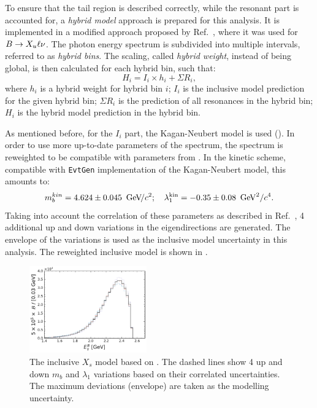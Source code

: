 To ensure that the tail region is described correctly, while the resonant part is accounted for, a \textit{hybrid model} approach is prepared for this analysis.
It is implemented in a modified approach proposed by Ref.~\cite{Ramirez:1989yk}, where it was used for $B\rightarrow X_u\ell\nu$.
The \BtoXsgamma photon energy spectrum is subdivided into multiple intervals, referred to as \textit{hybrid bins}.
The scaling, called \textit{hybrid weight}, instead of being global, is then calculated for each hybrid bin, such that:
\begin{equation}\label{eq:hybrid_model_definition}
    H_i = I_i\times h_i + \Sigma R_i,
\end{equation}
where $h_i$ is a hybrid weight for hybrid bin $i$; 
$I_i$ is the inclusive model prediction for the given hybrid bin; 
$\Sigma R_i$ is the prediction of all resonances in the hybrid bin;
$H_i$ is the hybrid model prediction in the hybrid bin.

As mentioned before, for the $I_i$ part, the Kagan-Neubert model is used ().
In order to use more up-to-date parameters of the spectrum, the spectrum is reweighted to be compatible with parameters from .
In the kinetic scheme, compatible with \texttt{EvtGen} implementation of the Kagan-Neubert model, this amounts to:
\begin{equation}\label{eq:simba_result_kinetic}
    m_b^{kin} =4.624 \pm 0.045~{\mathrm{\,Ge\kern -0.1em V\!/}c^2};  \quad \lambda^{\mathrm{kin}}_1 = -0.35\pm0.08~\mathrm{\,Ge\kern -0.1em V}^2/c^4.
\end{equation}
Taking into account the correlation of these parameters as described in Ref.~\cite{Bernlochner:2020jlt}, 4 additional up and down variations in the eigendirections are generated. 
The envelope of the variations is used as the inclusive model uncertainty in this analysis.
The reweighted inclusive model is shown in .
\begin{figure}[htbp!]
    \centering
    \includegraphics[width=0.45\textwidth]{figures/data_samples/xs_model_inclusive.pdf}
    \caption{\label{fig:inclusive_reweighted}The inclusive $X_s$ model based on .
    The dashed lines show 4 up and down $m_b$ and $\lambda_1$ variations based on their correlated uncertainties.
    The maximum deviations (envelope) are taken as the modelling uncertainty.}
\end{figure}

